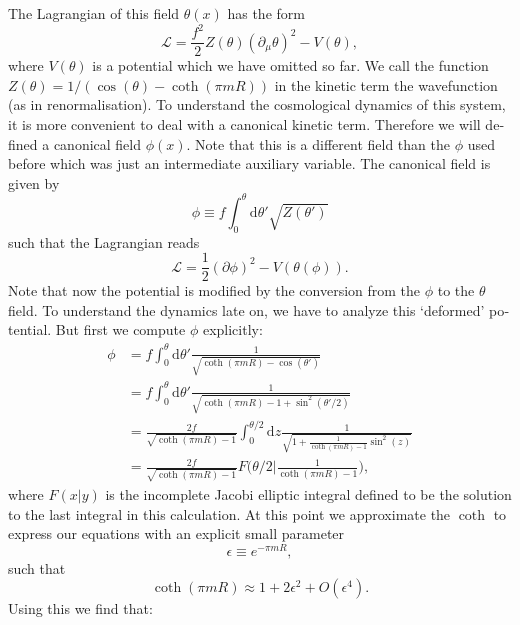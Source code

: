 \documentclass[master,       %
               twoside,        %
               BCOR10mm,       %
               english,ngerman, %
               ]{GAUBM}
\begin{document}
\begin{otherlanguage}{english}
The Lagrangian of this field $\theta(x)$ has the form
\begin{equation}
	\mathcal{L} = \frac{f^2}{2} Z(\theta) (\partial_\mu \theta)^2 - V(\theta),
\end{equation}
where $V(\theta)$ is a potential which we have omitted so far.
We call the function $Z(\theta) = 1 / (\cos(\theta) - \coth(\pi m R))$ in the kinetic term the wavefunction (as in renormalisation).
To understand the cosmological dynamics of this system, it is more convenient to deal with a canonical kinetic term. Therefore we will defined a canonical field $\phi(x)$. Note that this is a different field than the $\phi$ used before which was just an intermediate auxiliary variable.
The canonical field is given by
\begin{equation}
	\phi \equiv f \int_0^\theta \mathrm{d} \theta' \sqrt{Z(\theta')}
\end{equation}
such that the Lagrangian reads
\begin{equation}
	\mathcal{L} = \frac{1}{2} (\partial \phi)^2 - V(\theta(\phi)).
\end{equation}
Note that now the potential is modified by the conversion from the $\phi$ to the $\theta$ field. To understand the dynamics late on, we have to analyze this `deformed' potential.
But first we compute $\phi$ explicitly:
\begin{align}
	\phi &= f \int_0^\theta \mathrm{d} \theta' \frac{1}{\sqrt{\coth(\pi mR) - \cos(\theta')}} \nonumber \\
	&= f \int_0^\theta \mathrm{d} \theta' \frac{1}{\sqrt{\coth(\pi mR) - 1 + \sin^2(\theta'/2)}} \nonumber \\
	&= \frac{2 f}{\sqrt{\coth(\pi mR) - 1}} \int_0^{\theta/2} \mathrm{d} z \frac{1}{\sqrt{1 + \frac{1}{\coth(\pi mR) - 1} \sin^2(z)}} \nonumber \\
	&= \frac{2 f}{\sqrt{\coth(\pi mR) - 1}} F\big(\theta / 2 \big| \frac{1}{\coth(\pi mR) - 1}\big),
\end{align}
where $F(x|y)$ is the incomplete Jacobi elliptic integral defined to be the solution to the last integral in this calculation.
At this point we approximate the $\coth$ to express our equations with an explicit small parameter
\begin{equation}
	\epsilon \equiv e^{-\pi m R},
\end{equation}
such that
\begin{equation}
	\coth(\pi m R) \approx 1 + 2 \epsilon^2 + O(\epsilon^4).
\end{equation}
Using this we find that:

\end{otherlanguage}
\end{document}
